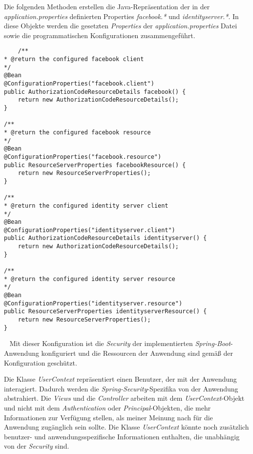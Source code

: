 Die folgenden Methoden erstellen die Java-Repräsentation der in der \emph{application.properties} definierten Properties \emph{facebook.*} und \emph{identityserver.*}. In diese Objekte werden die gesetzten \emph{Properties} der \emph{application.properties} Datei sowie die programmatischen Konfigurationen zusammengeführt.
\begin{verbatim}
    /**
* @return the configured facebook client
*/
@Bean
@ConfigurationProperties("facebook.client")
public AuthorizationCodeResourceDetails facebook() {
	return new AuthorizationCodeResourceDetails();
}

/**
* @return the configured facebook resource
*/
@Bean
@ConfigurationProperties("facebook.resource")
public ResourceServerProperties facebookResource() {
	return new ResourceServerProperties();
}

/**
* @return the configured identity server client
*/
@Bean
@ConfigurationProperties("identityserver.client")
public AuthorizationCodeResourceDetails identityserver() {
	return new AuthorizationCodeResourceDetails();
}

/**
* @return the configured identity server resource
*/
@Bean
@ConfigurationProperties("identityserver.resource")
public ResourceServerProperties identityserverResource() {
	return new ResourceServerProperties();
}
\end{verbatim}
\ \newline
Mit dieser Konfiguration ist die \emph{Security} der implementierten \emph{Spring-Boot}-Anwendung konfiguriert und die Ressourcen der Anwendung sind gemäß der Konfiguration geschützt.
\newpage

Die Klasse \emph{UserContext} repräsentiert einen Benutzer, der mit der Anwendung interagiert. Dadurch werden die \emph{Spring-Security}-Spezifika von der Anwendung abstrahiert. Die \emph{Views} und die \emph{Controller} arbeiten mit dem \emph{UserContext}-Objekt und nicht mit dem \emph{Authentication} oder \emph{Principal}-Objekten, die mehr Informationen zur Verfügung stellen, als meiner Meinung nach für die Anwendung zugänglich sein sollte.
\newline\newline
Die Klasse \emph{UserContext} könnte noch zusätzlich benutzer- und anwendungsspezifische Informationen enthalten, die unabhängig von der \emph{Security} sind.  

